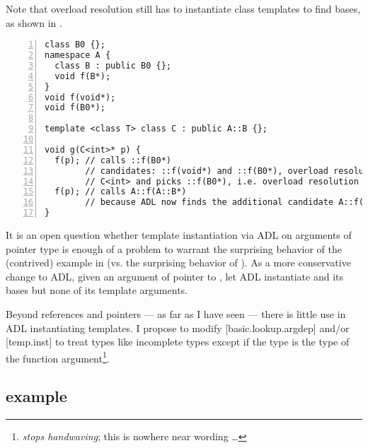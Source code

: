 Note that overload resolution still has to instantiate class templates to find bases, as 
shown in .
\begin{lstlisting}[style=Vc,numbers=left,float={hbtp},label=lst:instantiateOverloadResolution,caption={
Class template instantiation on overload resolution if ADL does not instantiate 
\code{C<int>}
}]
class B0 {};
namespace A {
  class B : public B0 {};
  void f(B*);
}
void f(void*);
void f(B0*);

template <class T> class C : public A::B {};

void g(C<int>* p) {
  f(p); // calls ::f(B0*)
        // candidates: ::f(void*) and ::f(B0*), overload resolution instantiates
        // C<int> and picks ::f(B0*), i.e. overload resolution works unchanged
  f(p); // calls A::f(A::B*)
        // because ADL now finds the additional candidate A::f(A::B*)
}
\end{lstlisting}
\label{sec:adl on pointers}
It is an open question whether template instantiation via ADL on arguments of pointer type 
is enough of a problem to warrant the surprising behavior of the (contrived) example in 
 (vs. the surprising behavior of ). As a 
more conservative change to ADL, given an argument of pointer to , let ADL 
instantiate  and its bases but none of its template arguments.

Beyond references and pointers --- as far as I have seen --- there is little use in ADL 
instantiating templates. I propose to modify [basic.lookup.argdep] and/or [temp.inst] to 
treat \notyetinstantiated{} types like incomplete types except if the 
\notyetinstantiated{} type is the type of the function argument\footnote{\emph{stops 
handwaving}; this is nowhere near wording \ldots}.

\subsection{ example}\label{sec:reference_wrapper}

